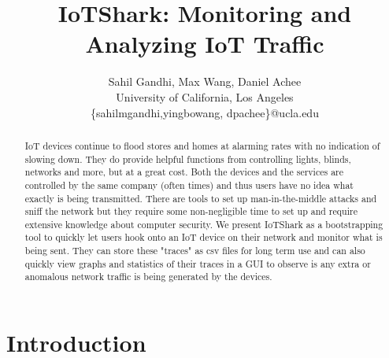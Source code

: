 \documentclass[letterpaper,twocolumn,10pt]{article}
\begin{document}

\date{}

\title{\Large \bf IoTShark: Monitoring and Analyzing IoT Traffic}

\author{
{\rm Sahil Gandhi, Max Wang, Daniel Achee}\\
University of California, Los Angeles \\
\{sahilmgandhi,yingbowang, dpachee\}@ucla.edu
} %

\maketitle

\begin{abstract}
IoT devices continue to flood stores and homes at alarming rates with no indication of slowing down. 
They do provide helpful functions from controlling lights, blinds, networks and more, but at a great cost. 
Both the devices and the services are controlled by the same company (often times) and thus users have no idea what exactly is being transmitted. 
There are tools to set up man-in-the-middle attacks and sniff the network but they require some non-negligible time to set up and require extensive knowledge about computer security. 
We present IoTShark as a bootstrapping tool to quickly let users hook onto an IoT device on their network and monitor what is being sent. 
They can store these "traces" as csv files for long term use and can also quickly view graphs and statistics of their traces in a GUI to observe is any extra or anomalous network traffic is being generated by the devices.

\end{abstract}

\section{Introduction}
\end{document}
